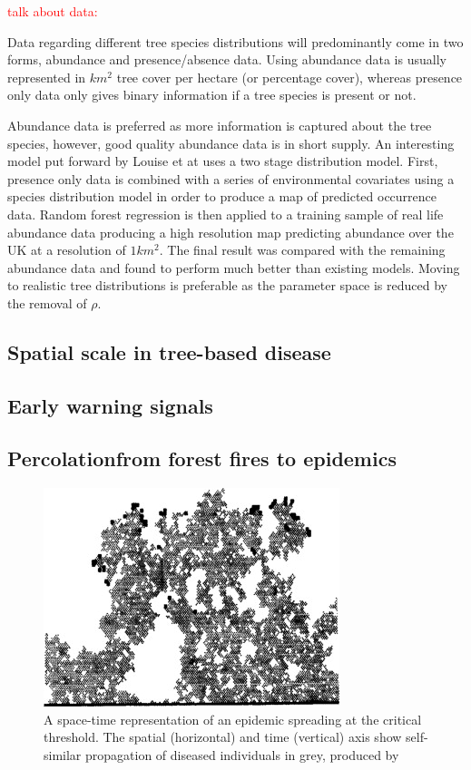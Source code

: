 \textcolor{red}{talk about data:}

Data regarding different tree species distributions will predominantly come in two forms, abundance and presence/absence data. Using abundance data is usually represented in $km^2$ tree cover per hectare (or percentage cover), whereas presence only data only gives binary information if a tree species is present or not.

Abundance data is preferred as more information is captured about the tree species, however, good quality abundance data is in short supply. An interesting model put forward by Louise et at \cite{2STAGE} uses a two stage distribution model. First, presence only data is combined with a series of environmental covariates using a species distribution model in order to produce a map of predicted occurrence data. Random forest regression is then applied to a training sample of real life abundance data producing a high resolution map predicting abundance over the UK at a resolution of $1km^2$. The final result was compared with the remaining abundance data and found to perform much better than existing models. Moving to realistic tree distributions is preferable as the parameter space is reduced by the removal of $\rho$.

\subsection{Spatial scale in tree-based disease}
\cite{https://doi.org/10.1111/jbi.13642}

\subsection{Early warning signals}
\label{section:ews}
\subsection{Percolation\textemdash from forest fires to epidemics}
\label{section:lit-rev-perc}
\begin{figure}
    \centering
    \includegraphics{chapter2/figures/perc1.jpg}
    \caption{A space-time representation of an epidemic spreading at the critical threshold. The spatial (horizontal) and time (vertical) axis show self-similar propagation of diseased individuals in grey, produced by \cite{GRASSBERGER1986273}}
    \label{fig:1d_perc_basis}
\end{figure}

